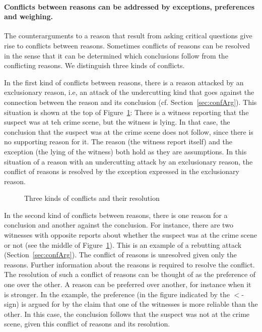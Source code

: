 \documentclass[10pt]{article}
\begin{document}
\paragraph{Conflicts between reasons can be addressed by exceptions, preferences and weighing.} The counterarguments to a reason that result from asking critical questions give rise to conflicts between reasons. Sometimes conflicts of reasons can be resolved in the sense that it can be determined which conclusions follow from the conflicting reasons. We distinguish three kinds of conflicts. 

In the first kind of conflicts between reasons, there is a reason attacked by an exclusionary reason, i.e, an attack of the undercutting kind that goes against the connection between the reason and its conclusion (cf. Section~\ref{sec:confArg}). This situation is shown at the top of Figure~\ref{fig:conflicts}: There is a witness reporting that the suspect was at teh crime scene, but the witness is lying. In that case, the conclusion that the suspect was at the crime scene does not follow, since there is no supporting reason for it. The reason (the witness report itself) and the exception (the lying of the witness) both hold as they are assumptions. In this situation of a reason with an undercutting attack by an exclusionary reason, the conflict of reasons is resolved by the exception expressed in the exclusionary reason.

\begin{figure}[bt]
\centering

\caption{Three kinds of conflicts and their resolution\label{fig:conflicts}}
\end{figure}

In the second kind of conflicts between reasons, there is one reason for a conclusion and another against the conclusion. For instance, there are two witnesses with opposite reports about whether the suspect was at the crime scene or not (see the middle of Figure~\ref{fig:conflicts}). This is an example of a rebutting attack (Section~\ref{sec:confArg}). The conflict of reasons is unresolved given only the reasons. Further information about the reasons is required to resolve the conflict. The resolution of such a conflict of reasons can be thought of as the preference of one over the other. A reason can be preferred over another, for instance when it is stronger. In the example, the preference (in the figure indicated by the $<$-sign) is argued for by the claim that one of the witnesses is more reliable than the other. In this case, the conclusion follows that the suspect was not at the crime scene, given this conflict of reasons and its resolution. 
\end{document}
